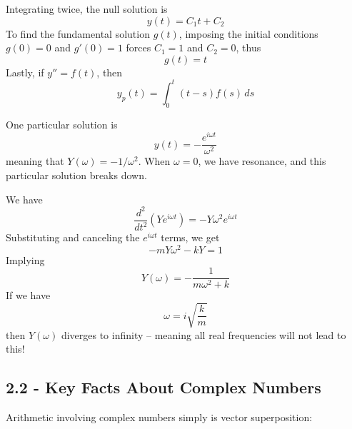 \documentclass[a4paper]{article}
\begin{document}
Integrating twice, the null solution is
\[
	y \!\left( t \right) = C_{1} t + C_{2}
\]
To find the fundamental solution \(g \!\left( t \right) \), imposing the initial conditions \(g \!\left( 0 \right) = 0\) and \(g'\!\left( 0 \right) = 1\) forces \(C_{1} = 1\) and \(C_{2} = 0\), thus
\[
	g \!\left( t \right) = t
\]
Lastly, if \(y'' = f \!\left( t \right) \), then
\[
	y_{p}\!\left( t \right) = \int^{t}_{0} \!\left( t - s \right) f \!\left( s \right)  \, ds 
\]

One particular solution is
\[
	y \!\left( t \right) = -\frac{e^{i \omega t}}{\omega^{2}}
\]
meaning that \(Y \!\left( \omega  \right) = - 1 / \omega^{2}\). When \(\omega = 0\), we have resonance, and this particular solution breaks down.

\vspace{12pt}


We have
\[
	\frac{d^{2} }{d t^{2}} \!\left( Y e^{i \omega t} \right) = - Y \omega^{2} e^{i \omega t}
\]
Substituting and canceling the \(e^{i \omega t}\) terms, we get
\[
	-mY \omega^{2} - kY = 1
\]
Implying
\[
	Y \!\left( \omega  \right) = -\frac{1}{m \omega^{2} + k}
\]
If we have
\[
	\omega = i \sqrt{\frac{k}{m}}
\]
then \(Y \!\left( \omega  \right) \) diverges to infinity -- meaning all real frequencies will not lead to this!

\newpage

\subsection{\textsf{2.2 - Key Facts About Complex Numbers}}


Arithmetic involving complex numbers simply is vector superposition:
\end{document}
